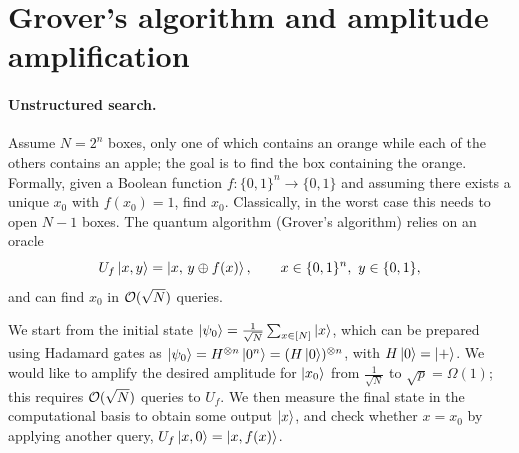 \section{Grover's algorithm and amplitude amplification}\label{sec:sec02-grover}

\paragraph{Unstructured search.}
Assume $N = 2^n$ boxes, only one of which contains an orange while each of the
others contains an apple; the goal is to find the box containing the orange.
Formally, given a Boolean function $f : \{0,1\}^n \to \{0,1\}$ and assuming there
exists a unique $x_0$ with $f(x_0) = 1$, find $x_0$. Classically, in the worst
case this needs to open $N - 1$ boxes. The quantum algorithm (Grover's
algorithm) relies on an oracle
\begin{equation}
  U_f\ket{x, y} = \ket{x,\, y \oplus f(x)}, \qquad x \in \{0,1\}^n,\ y \in \{0,1\},
\end{equation}
and can find $x_0$ in $\mathcal{O}(\sqrt{N})$ queries.

We start from the initial state
$\ket{\psi_0} = \tfrac{1}{\sqrt{N}}\sum_{x \in [N]} \ket{x}$, which can be
prepared using Hadamard gates as
$\ket{\psi_0} = H^{\otimes n}\ket{0^n} = (H\ket{0})^{\otimes n}$, with
$H\ket{0} = \ket{+}$. We would like to amplify the desired amplitude for
$\ket{x_0}$ from $\tfrac{1}{\sqrt{N}}$ to $\sqrt{p} = \Omega(1)$; this requires
$\mathcal{O}(\sqrt{N})$ queries to $U_f$. We then measure the final state in the
computational basis to obtain some output $\ket{x}$, and check whether $x = x_0$
by applying another query, $U_f\ket{x, 0} = \ket{x, f(x)}$.

